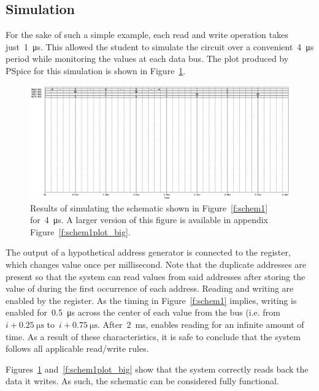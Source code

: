 \subsection{Simulation}
For the sake of such a simple example, each read and write operation takes
just~\SI{1}{\micro\second}.  This allowed the student to simulate the circuit
over a convenient~\SI{4}{\micro\second} period while monitoring the values at
each data bus.  The plot produced by PSpice for this simulation is shown in
Figure~\ref{f:schem1plot}.
%
\begin{figure}[H]
\centering
	\includegraphics[width=.8\textwidth]{img/shot/sim1_plot.png}
	\parbox{.8\textwidth}{
	\caption[Part 1 Simulation Results]{Results of simulating the schematic
	shown in Figure~\ref{f:schem1} for~\SI{4}{\micro\second}.  A larger version
	of this figure is available in appendix Figure~\ref{f:schem1plot_big}.}
	\label{f:schem1plot}}
\end{figure}
%
The output of a hypothetical address generator is connected to the 
register, which changes value once per millisecond.  Note that the duplicate
addresses are present so that the system can read values from said addresses
after storing the value of  during the first occurrence of each address.
Reading and writing are enabled by the   register.  As the timing in
Figure~\ref{f:schem1} implies, writing is enabled for~\SI{0.5}{\micro\second}
across the center of each value from the  bus (i.e. from~$i +
\SI{0.25}{\micro\second}$ to~$i + \SI{0.75}{\micro\second}$.
After~\SI{2}{\milli\second},  enables reading for an infinite amount of
time.  As a result of these characteristics, it is safe to conclude that the
system follows all applicable read/write rules.

Figures~\ref{f:schem1plot} and~\ref{f:schem1plot_big} show that the system
correctly reads back the data it writes.  As such, the schematic can be
considered fully functional.
